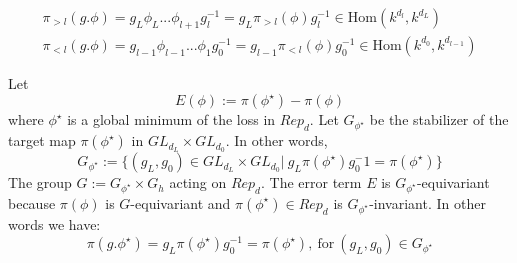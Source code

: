 \documentclass{article}
\theoremstyle{definition}
\begin{document}
\begin{align*}
    \pi_{>l}(g.\phi) = g_L\phi_L...\phi_{l+1}g_{l}^{-1} = g_L \pi_{>l}(\phi) g_l^{-1} \in\text{Hom}(k^{d_l},k^{d_L})\\
    \pi_{<l}(g.\phi) = g_{l-1}\phi_{l-1}...\phi_{1}g_{0}^{-1} = g_{l-1} \pi_{<l}(\phi) g_{0}^{-1} \in \text{Hom}(k^{d_0},k^{d_{l-1}})
\end{align*}

Let $$ E(\phi) := \pi(\phi^{\star}) - \pi(\phi)$$ where $\phi^{\star}$ is a global minimum of the loss in $Rep_d$. Let $G_{\phi^{\star}}$ be the stabilizer of the target map $\pi(\phi^{\star})$ in $GL_{d_L} \times GL_{d_0}$. In other words, $$G_{\phi^{\star}}:= \{(g_L,g_0)\in GL_{d_L}\times GL_{d_0}|\ g_L\pi(\phi^{\star})g_0^-1 =\pi(\phi^{\star})\}$$ The group $G:=G_{\phi^{\star}} \times G_h$ acting on $Rep_d$. The error term $E$ is $G_{\phi^{\star}}$-equivariant because $\pi(\phi)$ is $G$-equivariant and $\pi(\phi^{\star})\in Rep_d$ is $G_{\phi^\star}$-invariant. In other words we have:
\begin{equation*}
    \pi(g.\phi^{\star}) = g_L\pi(\phi^{\star})g_0^{-1} = \pi(\phi^{\star}), \ \text{for} \ (g_L,g_0)\in G_{\phi^{\star}}
\end{equation*}
\end{document}
